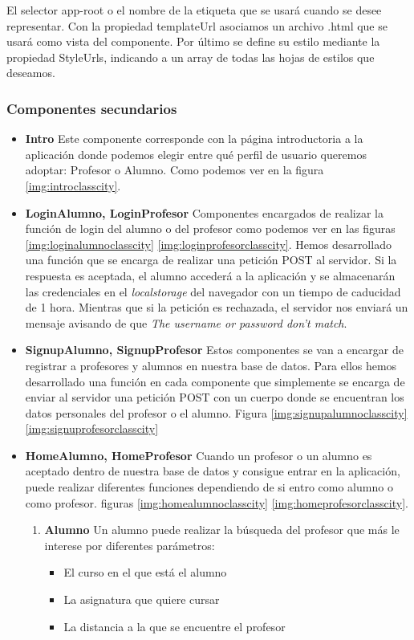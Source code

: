 El selector app-root o el nombre de la etiqueta que se usará cuando se desee representar. Con la propiedad templateUrl asociamos un archivo .html que se usará como vista del componente. Por último se define su estilo mediante la propiedad StyleUrls, indicando a un array de todas las hojas de estilos que deseamos.

\subsubsection{Componentes secundarios }

\begin{itemize}
\item \textbf{Intro} Este componente corresponde con la página introductoria a la aplicación donde podemos elegir entre qué perfil de usuario queremos adoptar: Profesor o Alumno. Como podemos ver en la figura \ref{img:introclasscity}.

\item \textbf{LoginAlumno, LoginProfesor} Componentes encargados de realizar la función de login del alumno o del profesor como podemos ver en las figuras \ref{img:loginalumnoclasscity} \ref{img:loginprofesorclasscity}. Hemos desarrollado una función que se encarga de realizar una petición POST al servidor. Si la respuesta es aceptada, el alumno accederá a la aplicación y se almacenarán las credenciales en el \textit{localstorage} del navegador con un tiempo de caducidad de 1 hora. Mientras que si la petición es rechazada, el servidor nos enviará un mensaje avisando de que \textit{The username or password don't match}.

\item \textbf{SignupAlumno, SignupProfesor} Estos componentes se van a encargar de registrar a profesores y alumnos en nuestra base de datos. Para ellos hemos desarrollado una función en cada componente que simplemente se encarga de enviar al servidor una petición POST con un cuerpo donde se encuentran los datos personales del profesor o el alumno. Figura \ref{img:signupalumnoclasscity} \ref{img:signuprofesorclasscity}

\item \textbf{HomeAlumno, HomeProfesor} Cuando un profesor o un alumno es aceptado dentro de nuestra base de datos y consigue entrar en la aplicación, puede realizar diferentes funciones dependiendo de si entro como alumno o como profesor. figuras \ref{img:homealumnoclasscity} \ref{img:homeprofesorclasscity}.

\begin{enumerate}
\item \textbf{Alumno }  Un alumno puede realizar la búsqueda del profesor que más le interese por diferentes parámetros:
\begin{itemize}
    \item{El curso en el que está el alumno}
    \item{La asignatura que quiere cursar}
    \item{La distancia a la que se encuentre el profesor}
\end{itemize}


\end{enumerate}
\end{itemize}
